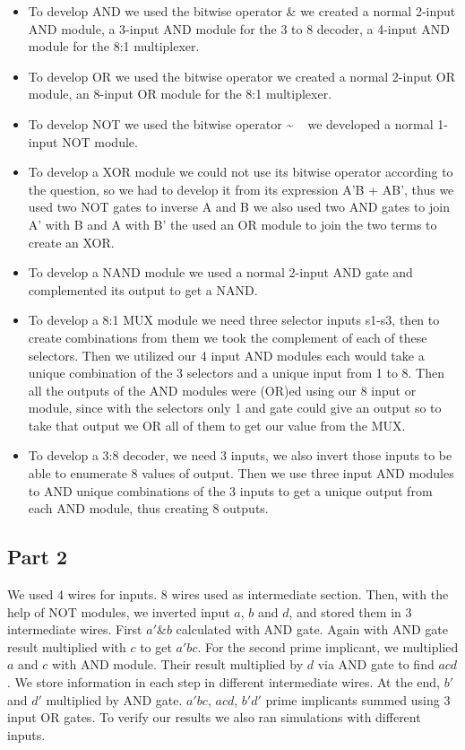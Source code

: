 \documentclass[pdftex,12pt,a4paper]{article}
\begin{document}
\begin{itemize}
\item To develop AND we used the bitwise operator \&
we created a normal 2-input AND module, a 3-input AND module for the 3 to 8 decoder, a 4-input AND module for the 8:1 multiplexer. 
\item To develop OR we used the bitwise operator \textbar
we created a normal 2-input OR module, an 8-input OR module for the 8:1 multiplexer.
\item To develop NOT we used the bitwise operator \~ ~ 
we developed a normal 1-input NOT module.
\item To develop a XOR module we could not use its bitwise operator according to the question, so we had to develop it from its expression A'B + AB', thus we used two NOT gates to inverse A and B we also used two AND gates to join A' with B and A with B' the used an OR module to join the two terms to create an XOR.
\item To develop a NAND module we used a normal 2-input AND gate and complemented its output to get a NAND.
\item To develop a 8:1 MUX module we need three selector inputs s1-s3, then to create combinations from them we took the complement of each of these selectors. Then we utilized our 4 input AND modules each would take a unique combination of the 3 selectors and a unique input from 1 to 8. Then all the outputs of the AND modules were (OR)ed using our 8 input or module, since with the selectors only 1 and gate could give an output so to take that output we OR all of them to get our value from the MUX.
\item To develop a 3:8 decoder, we need 3 inputs, we also invert those inputs to be able to enumerate 8 values of output. Then we use three input AND modules to AND unique combinations of the 3 inputs to get a unique output from each AND module, thus creating 8 outputs.
\end{itemize}

\subsection{Part 2}
We used 4 wires for inputs. 8 wires used as intermediate section. Then, with the help of NOT modules, we inverted input $a$, $b$ and $d$, and stored them in 3 intermediate wires. First $a' \& b$ calculated with AND gate. Again with AND gate result multiplied with $c$ to get $a'bc$. For the second prime implicant, we multiplied $a$ and $c$ with AND module. Their result multiplied by $d$ via AND gate to find $acd$. We store information in each step in different intermediate wires. At the end, $b'$ and $d'$ multiplied by AND gate. $a'bc$, $acd$, $b'd'$ prime implicants summed using 3 input OR gates. To verify our results we also ran simulations with different inputs.
\end{document}
